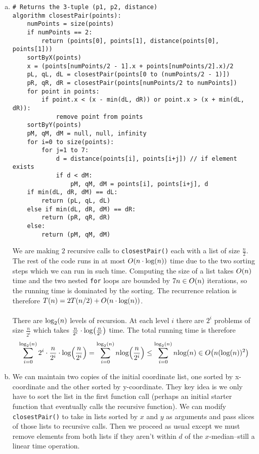 \documentclass[11pt]{article}
\let\origleft\left
\let\origright\right
\renewcommand{\left}{\mathopen{}\mathclose\bgroup\origleft}
\renewcommand{\right}{\aftergroup\egroup\origright}
\newcommand{\p}[1]{\left(#1\right)}
\renewcommand{\log}[1]{\text{log}\p{#1}}
\newcommand{\logb}[2]{\text{log}_{#1}\p{#2}}
\newcommand{\BigOh}[1]{O\p{#1}}
\begin{document}
\begin{enumerate}[(a)]
\newpage
\item \begin{verbatim}
# Returns the 3-tuple (p1, p2, distance)
algorithm closestPair(points):
    numPoints = size(points)
    if numPoints == 2:
        return (points[0], points[1], distance(points[0], points[1]))
    sortByX(points)
    x = (points[numPoints/2 - 1].x + points[numPoints/2].x)/2
    pL, qL, dL = closestPair(points[0 to (numPoints/2 - 1)])
    pR, qR, dR = closestPair(points[numPoints/2 to numPoints])
    for point in points:
        if point.x < (x - min(dL, dR)) or point.x > (x + min(dL, dR)):
            remove point from points
    sortByY(points)
    pM, qM, dM = null, null, infinity
    for i=0 to size(points):
        for j=1 to 7:
            d = distance(points[i], points[i+j]) // if element exists
            if d < dM:
                pM, qM, dM = points[i], points[i+j], d
    if min(dL, dR, dM) == dL:
        return (pL, qL, dL)
    else if min(dL, dR, dM) == dR:
        return (pR, qR, dR)
    else:
        return (pM, qM, dM)
\end{verbatim}
We are making $2$ recursive calls to \verb|closestPair()| each with a list of size $\frac n2$. The rest of the code runs in at most $\BigOh{n\cdot\log n}$ time due to the two sorting steps which we can run in such time. Computing the size of a list takes $\BigOh{n}$ time and the two nested \verb|for| loops are bounded by $7n \in \BigOh{n}$ iterations, so the running time is dominated by the sorting. The recurrence relation is therefore $T(n) = 2T(n/2)+\BigOh{n\cdot\log n}$. \\\\
There are $\logb 2n$ levels of recursion. At each level $i$ there are $2^i$ problems of size $\frac n{2^i}$ which takes $\frac n{2^i}\cdot \log{\frac n{2^i}}$ time. The total running time is therefore $$\sum_{i=0}^{\logb 2n} 2^i\cdot \frac n{2^i}\cdot \log{\frac n{2^i}} = \sum_{i=0}^{\logb 2n} n\log{\frac n{2^i}} \leq \sum_{i=0}^{\logb 2n} n\log n \in \BigOh{n(\log n)^2}$$
\newpage
\item We can maintain two copies of the initial coordinate list, one sorted by x-coordinate and the other sorted by y-coordinate. They key idea is we only have to sort the list in the first function call (perhaps an initial starter function that eventually calls the recursive function). We can modify \verb|closestPair()| to take in lists sorted by $x$ and $y$ as arguments and pass slices of those lists to recursive calls. Then we proceed as usual except we must remove elements from both lists if they aren't within $d$ of the $x$-median--still a linear time operation. \\\\

\end{enumerate}
\end{document}
